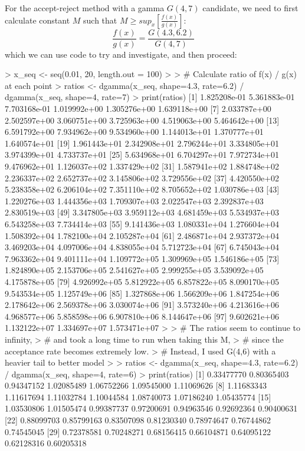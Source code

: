 \documentclass{article}
\begin{document}
{For the accept-reject method with a gamma \(G(4,7)\) candidate, we need to first calculate constant \(M\) such that \( M \geq sup_x[\frac{f(x)}{g(x)}]\):
\[
  \frac{f(x)}{g(x)} = \frac{G(4.3, 6.2)}{G(4, 7)}
\]
which we can use code to try and investigate, and then proceed:
\begin{spverbatim}
> x_seq <- seq(0.01, 20, length.out = 100)
> 
> # Calculate ratio of f(x) / g(x) at each point
> ratios <- dgamma(x_seq, shape=4.3, rate=6.2) / dgamma(x_seq, shape=4, rate=7)
> print(ratios)
  [1] 1.825208e-01 5.361883e-01 7.703168e-01 1.019992e+00 1.305276e+00 1.639118e+00
  [7] 2.033787e+00 2.502597e+00 3.060751e+00 3.725963e+00 4.519063e+00 5.464642e+00
 [13] 6.591792e+00 7.934962e+00 9.534960e+00 1.144013e+01 1.370777e+01 1.640574e+01
 [19] 1.961443e+01 2.342908e+01 2.796244e+01 3.334805e+01 3.974399e+01 4.733737e+01
 [25] 5.634968e+01 6.704297e+01 7.972734e+01 9.476962e+01 1.126037e+02 1.337429e+02
 [31] 1.587941e+02 1.884748e+02 2.236337e+02 2.652737e+02 3.145806e+02 3.729556e+02
 [37] 4.420550e+02 5.238358e+02 6.206104e+02 7.351110e+02 8.705652e+02 1.030786e+03
 [43] 1.220276e+03 1.444356e+03 1.709307e+03 2.022547e+03 2.392837e+03 2.830519e+03
 [49] 3.347805e+03 3.959112e+03 4.681459e+03 5.534937e+03 6.543258e+03 7.734414e+03
 [55] 9.141436e+03 1.080331e+04 1.276604e+04 1.508392e+04 1.782100e+04 2.105287e+04
 [61] 2.486871e+04 2.937372e+04 3.469203e+04 4.097006e+04 4.838055e+04 5.712723e+04
 [67] 6.745043e+04 7.963362e+04 9.401111e+04 1.109772e+05 1.309969e+05 1.546186e+05
 [73] 1.824890e+05 2.153706e+05 2.541627e+05 2.999255e+05 3.539092e+05 4.175878e+05
 [79] 4.926992e+05 5.812922e+05 6.857822e+05 8.090170e+05 9.543534e+05 1.125749e+06
 [85] 1.327868e+06 1.566209e+06 1.847254e+06 2.178642e+06 2.569378e+06 3.030074e+06
 [91] 3.573240e+06 4.213616e+06 4.968577e+06 5.858598e+06 6.907810e+06 8.144647e+06
 [97] 9.602621e+06 1.132122e+07 1.334697e+07 1.573471e+07
> 
> # The ratios seem to continue to infinity, 
> # and took a long time to run when taking this M, 
> # since the acceptance rate becomes extremely low.
> # Instead, I used G(4,6) with a heavier tail to better model
> 
> ratios <- dgamma(x_seq, shape=4.3, rate=6.2) / dgamma(x_seq, shape=4, rate=6)
> print(ratios)
  [1] 0.33477770 0.80365403 0.94347152 1.02085489 1.06752266 1.09545000 1.11069626
  [8] 1.11683343 1.11617694 1.11032784 1.10044584 1.08740073 1.07186240 1.05435774
 [15] 1.03530806 1.01505474 0.99387737 0.97200691 0.94963546 0.92692364 0.90400631
 [22] 0.88099703 0.85799163 0.83507098 0.81230340 0.78974647 0.76744862 0.74545045
 [29] 0.72378581 0.70248271 0.68156415 0.66104871 0.64095122 0.62128316 0.60205318

\end{spverbatim}}
\end{document}
